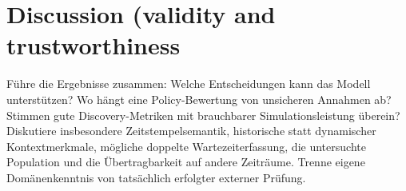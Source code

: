 \chapter{Discussion (validity and trustworthiness}
\label{chap:discussion}

Führe die Ergebnisse zusammen: Welche Entscheidungen kann das Modell unterstützen? Wo hängt eine Policy-Bewertung von unsicheren Annahmen ab? Stimmen gute Discovery-Metriken mit brauchbarer Simulationsleistung überein?
Diskutiere insbesondere Zeitstempelsemantik, historische statt dynamischer Kontextmerkmale, mögliche doppelte Wartezeiterfassung, die untersuchte Population und die Übertragbarkeit auf andere Zeiträume. Trenne eigene Domänenkenntnis von tatsächlich erfolgter externer Prüfung.